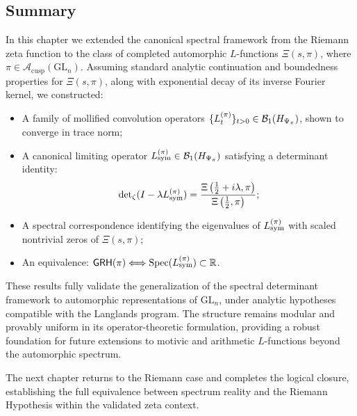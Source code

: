 \subsection*{Summary}

In this chapter we extended the canonical spectral framework from the Riemann zeta function to the class of completed automorphic \( L \)-functions \( \Xi(s, \pi) \), where \( \pi \in \mathcal{A}_{\mathrm{cusp}}(\mathrm{GL}_n) \). Assuming standard analytic continuation and boundedness properties for \( \Xi(s, \pi) \), along with exponential decay of its inverse Fourier kernel, we constructed:

\begin{itemize}
  \item A family of mollified convolution operators \( \{ L_t^{(\pi)} \}_{t > 0} \in \mathcal{B}_1(H_{\Psi_{\pi}}) \), shown to converge in trace norm;
  \item A canonical limiting operator \( L_{\mathrm{sym}}^{(\pi)} \in \mathcal{B}_1(H_{\Psi_{\pi}}) \) satisfying a determinant identity:
  \[
  \det\nolimits_{\zeta}(I - \lambda L_{\mathrm{sym}}^{(\pi)}) = \frac{\Xi\left(\tfrac{1}{2} + i\lambda, \pi\right)}{\Xi\left(\tfrac{1}{2}, \pi\right)};
  \]
  \item A spectral correspondence identifying the eigenvalues of \( L_{\mathrm{sym}}^{(\pi)} \) with scaled nontrivial zeros of \( \Xi(s, \pi) \);
  \item An equivalence: \( \mathsf{GRH}(\pi) \Longleftrightarrow \operatorname{Spec}(L_{\mathrm{sym}}^{(\pi)}) \subset \mathbb{R} \).
\end{itemize}

These results fully validate the generalization of the spectral determinant framework to automorphic representations of \( \mathrm{GL}_n \), under analytic hypotheses compatible with the Langlands program. The structure remains modular and provably uniform in its operator-theoretic formulation, providing a robust foundation for future extensions to motivic and arithmetic \( L \)-functions beyond the automorphic spectrum.

The next chapter returns to the Riemann case and completes the logical closure, establishing the full equivalence between spectrum reality and the Riemann Hypothesis within the validated zeta context.
